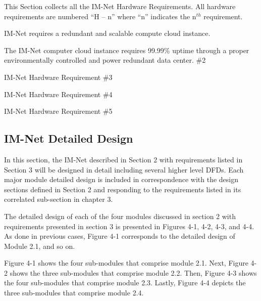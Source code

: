 \documentclass[letterpaper,12pt]{article}
\newcounter{qcounter}						%
\begin{document}
{This Section collects all the IM-Net Hardware Requirements. All hardware requirements are numbered ``H -- n'' where ``n'' indicates the n${}^{th}$ requirement.

\begin{list}{H -- :~}{}

\item  IM-Net requires a redundant and scalable compute cloud instance.

\item  The IM-Net computer cloud instance requires 99.99\% uptime through a proper environmentally controlled and power redundant data center. \#2

\item  IM-Net Hardware Requirement \#3

\item  IM-Net Hardware Requirement \#4

\item  IM-Net Hardware Requirement \#5

\end{list}

\eject

\textcolor{section}{\section{IM-Net Detailed Design}}

In this section, the IM-Net described in Section 2 with requirements listed in Section 3 will be designed in detail including several higher level DFDs. Each major module detailed design is included in correspondence with the design sections defined in Section 2 and responding to the requirements listed in its correlated sub-section in chapter 3.

The detailed design of each of the four modules discussed in section 2 with requirements presented in section 3 is presented in Figures 4-1, 4-2, 4-3, and 4-4. As done in previous cases, Figure 4-1 corresponds to the detailed design of Module 2.1, and so on.

Figure 4-1 shows the four sub-modules that comprise module 2.1. Next, Figure 4-2 shows the three sub-modules that comprise module 2.2. Then, Figure 4-3 shows the four sub-modules that comprise module 2.3. Lastly, Figure 4-4 depicts the three sub-modules that comprise module 2.4.

}
\end{document}

